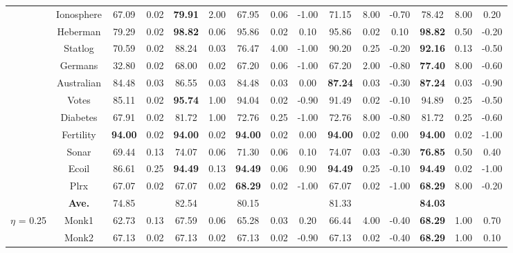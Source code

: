 \documentclass[journal,12pn, onecolumn]{IEEEtran}
\begin{document}
{{{\begin{table}
{{\begin{tabular}{ccccccccccccccc}
          & Ionosphere & 67.09  & 0.02  & \textbf{79.91 } & 2.00  & 67.95  & 0.06  & -1.00  & 71.15  & 8.00  & -0.70  & 78.42  & 8.00  & 0.20  \\
          & Heberman & 79.29  & 0.02  & \textbf{98.82 } & 0.06  & 95.86  & 0.02  & 0.10  & 95.86  & 0.02  & 0.10  & \textbf{98.82 } & 0.50  & -0.20  \\
          & Statlog & 70.59  & 0.02  & 88.24  & 0.03  & 76.47  & 4.00  & -1.00  & 90.20  & 0.25  & -0.20  & \textbf{92.16 } & 0.13  & -0.50  \\
          & Germans & 32.80  & 0.02  & 68.00  & 0.02  & 67.20  & 0.06  & -1.00  & 67.20  & 2.00  & -0.80  & \textbf{77.40 } & 8.00  & -0.60  \\
          & Australian & 84.48  & 0.03  & 86.55  & 0.03  & 84.48  & 0.03  & 0.00  & \textbf{87.24 } & 0.03  & -0.30  & \textbf{87.24 } & 0.03  & -0.90  \\
          & Votes & 85.11  & 0.02  & \textbf{95.74 } & 1.00  & 94.04  & 0.02  & -0.90  & 91.49  & 0.02  & -0.10  & 94.89  & 0.25  & -0.50  \\
          & Diabetes & 67.91  & 0.02  & 81.72  & 1.00  & 72.76  & 0.25  & -1.00  & 72.76  & 8.00  & -0.80  & 81.72  & 0.25  & -0.60  \\
          & Fertility & \textbf{94.00 } & 0.02  & \textbf{94.00 } & 0.02  & \textbf{94.00 } & 0.02  & 0.00  & \textbf{94.00 } & 0.02  & 0.00  & \textbf{94.00 } & 0.02  & -1.00  \\
          & Sonar & 69.44  & 0.13  & 74.07  & 0.06  & 71.30  & 0.06  & 0.10  & 74.07  & 0.03  & -0.30  & \textbf{76.85 } & 0.50  & 0.40  \\
          & Ecoil & 86.61  & 0.25  & \textbf{94.49 } & 0.13  & \textbf{94.49 } & 0.06  & 0.90  & \textbf{94.49 } & 0.25  & -0.10  & \textbf{94.49 } & 0.02  & -1.00  \\
          & Plrx  & 67.07  & 0.02  & 67.07  & 0.02  & \textbf{68.29 } & 0.02  & -1.00  & 67.07  & 0.02  & -1.00  & \textbf{68.29 } & 8.00  & -0.20  \\
\cmidrule{2-15}          & \textbf{Ave. } & 74.85  &       & 82.54  &       & 80.15  &       &       & 81.33  &       &       & \textbf{84.03 } &       &  \\
    \midrule
    \multirow{18}[3]{*}{$\eta$ = 0.25} & Monk1 & 62.73  & 0.13  & 67.59  & 0.06  & 65.28  & 0.03  & 0.20  & 66.44  & 4.00  & -0.40  & \textbf{68.29 } & 1.00  & 0.70  \\
          & Monk2 & 67.13  & 0.02  & 67.13  & 0.02  & 67.13  & 0.02  & -0.90  & 67.13  & 0.02  & -0.40  & \textbf{68.29 } & 1.00  & 0.10  \\

\end{tabular}}}
\end{table}}}}
\end{document}
